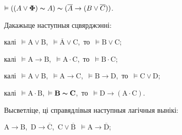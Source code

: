 \begin{problemList}
\begin{belarusianEnumerate}
\item $\vDash ((A \vee \boldsymbol{\Phi}) \thicksim A) \thicksim (\overline{A} \to
(B \vee \overline{C}))$.

\end{belarusianEnumerate}

\smallskip

\item
Дакажыце наступныя сцвярджэнні: \\

\begin{belarusianEnumerate}

\item калі\, $\vDash \boldsymbol{\mathrm{A}} \vee \boldsymbol{\mathrm{B}}$,\,
$\vDash \overline{\boldsymbol{\mathrm{A}}} \vee \boldsymbol{\mathrm{C}}$,\,
то\, $\vDash \boldsymbol{\mathrm{B}} \vee \boldsymbol{\mathrm{C}}$;

\item калі\, $\vDash \boldsymbol{\mathrm{A}} \to \boldsymbol{\mathrm{B}}$,\,
$\vDash \boldsymbol{\mathrm{A}} \cdot \boldsymbol{\mathrm{C}}$,\, то\,
$\vDash \boldsymbol{\mathrm{B}} \cdot \boldsymbol{\mathrm{C}}$;

\item калі\, $\vDash \boldsymbol{\mathrm{A}} \vee \boldsymbol{\mathrm{B}}$,\,
$\vDash \boldsymbol{\mathrm{A}} \to \boldsymbol{\mathrm{C}}$,\,
$\vDash \boldsymbol{\mathrm{B}} \to \boldsymbol{\mathrm{D}}$,\, то\,
$\vDash \boldsymbol{\mathrm{C}} \vee \boldsymbol{\mathrm{D}}$;

\item калі\, $\vDash \boldsymbol{\mathrm{A}} \cdot \boldsymbol{\mathrm{B}}$,\,
$\vDash \boldsymbol{\mathrm{B}} \thicksim \boldsymbol{\mathrm{C}}$,\, то\,
$\vDash \boldsymbol{\mathrm{D}} \to (\boldsymbol{\mathrm{A}} \cdot \boldsymbol{\mathrm{C}})$.

\end{belarusianEnumerate}

\smallskip

\item
Высветліце, ці справядлівыя наступныя лагічныя вынікі: \\

\begin{belarusianEnumerate}
\item $\boldsymbol{\mathrm{A}} \to \boldsymbol{\mathrm{B}}$,\,
$\boldsymbol{\mathrm{D}} \to \overline{\boldsymbol{\mathrm{C}}}$,\,
$\boldsymbol{\mathrm{C}} \vee \overline{\boldsymbol{\mathrm{B}}}$\,
$\vDash \boldsymbol{\mathrm{A}} \to \overline{\boldsymbol{\mathrm{D}}}$;


\end{belarusianEnumerate}
\end{problemList}
